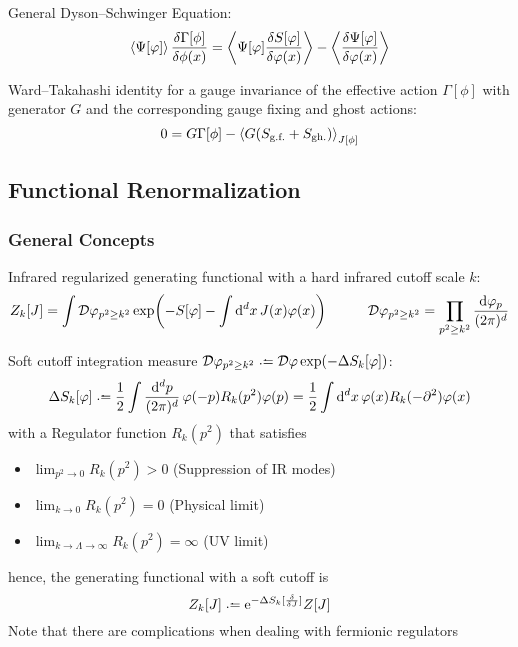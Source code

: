			\noindent
			General Dyson--Schwinger Equation:
			\begin{equation}
				\Avg{\Psi[\varphi]} \fdv{\Gamma[\phi]}{\phi(x)} = \Avg{\Psi[\varphi] \fdv{S[\varphi]}{\varphi(x)}} - \Avg{\fdv{\Psi[\varphi]}{\varphi(x)}}
			\end{equation}

			\noindent
			Ward--Takahashi identity for a gauge invariance of the effective action $\Gamma[\phi]$ with generator $G$ and the corresponding gauge fixing and ghost actions:
			\begin{equation}
				0 = G \Gamma[\phi] - \left\langle G(S_\text{g.f.} + S_\text{gh.}) \right\rangle_{J[\phi]}
			\end{equation}

	\subsection{Functional Renormalization}
		\subsubsection{General Concepts}
			Infrared regularized generating functional with a hard infrared cutoff scale $k$:
			\begin{equation}
				Z_k[J] = \int \mathcal{D}\varphi_{p^2 \ge k^2} \exp(-S[\varphi] - \int \dd^d x \, J(x) \varphi(x))
				\hspace{30pt} \mathcal{D}\varphi_{p^2 \ge k^2} = \prod_{p^2 \ge k^2} \frac{\dd \varphi_p}{(2\pi)^d}
			\end{equation}

			\noindent
			Soft cutoff integration measure $\mathcal{D}\varphi_{p^2 \ge k^2} \defeq \mathcal{D}\varphi \exp(-\Delta S_k[\varphi])$:
			\begin{equation}
				\Delta S_k[\varphi]
				\defeq \frac{1}{2} \int \frac{\dd^d p}{(2\pi)^d}\, \varphi(-p) R_k(p^2) \varphi(p)
				= \frac{1}{2} \int \dd[d]{x} \varphi(x) R_k(-\partial^2) \varphi(x)
			\end{equation}
			with a Regulator function $R_k(p^2)$ that satisfies
			\begin{itemize}\itemsep -0pt
				\item $\displaystyle\lim_{p^2 \to 0} R_k(p^2) > 0$ \hfill{(Suppression of IR modes)}
				\item $\displaystyle\lim_{k \to 0} R_k(p^2) = 0$ \hfill{(Physical limit)}
				\item $\displaystyle\lim_{k \to \Lambda \to \infty} R_k(p^2) = \infty$ \hfill{(UV limit)}
			\end{itemize}
			hence, the generating functional with a soft cutoff is
			\begin{equation}
				Z_k[J] \defeq \ex^{-\Delta S_k [\fdv{J}]}Z[J]
			\end{equation}
			Note that there are complications when dealing with fermionic regulators

